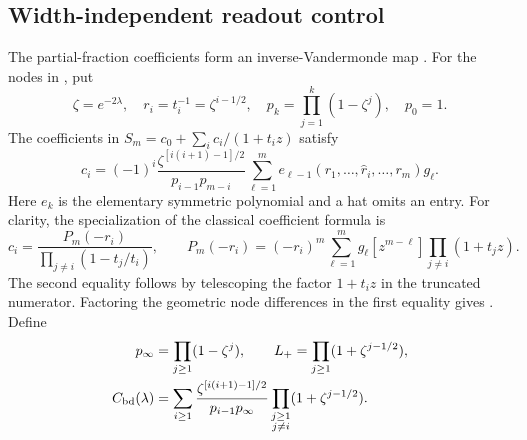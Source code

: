 \subsection{Width-independent readout control}
\label{sec:coefficients}
The partial-fraction coefficients form an inverse-Vandermonde map
\cite{Gautschi1962}. For the nodes in , put
\begin{equation}
 \zeta=e^{-2\lambda},\quad r_i=t_i^{-1}=\zeta^{i-1/2},\quad
 p_k=\prod_{j=1}^k(1-\zeta^j),\quad p_0=1.
 \label{eq:zeta-p}
\end{equation}
The coefficients in $S_m=c_0+\sum_i c_i/(1+t_i z)$ satisfy
\begin{equation}
 c_i=(-1)^i\frac{\zeta^{[i(i+1)-1]/2}}{p_{i-1}p_{m-i}}
 \sum_{\ell=1}^m e_{\ell-1}(r_1,\ldots,\widehat r_i,\ldots,r_m)g_\ell.
 \label{eq:scaled-pf}
\end{equation}
Here $e_k$ is the elementary symmetric polynomial and a hat omits an entry.
For clarity, the specialization of the classical coefficient formula is
\[
 c_i=\frac{P_m(-r_i)}{\prod_{j\ne i}(1-t_j/t_i)},\qquad
 P_m(-r_i)=(-r_i)^m\sum_{\ell=1}^m g_\ell
 [z^{m-\ell}]\prod_{j\ne i}(1+t_jz).
\]
The second equality follows by telescoping the factor $1+t_i z$ in the
truncated numerator. Factoring the geometric node differences in the
first equality gives .
Define
\begin{align}
 p_\infty&=\prod_{j\ge1}(1-\zeta^j),\qquad
 L_+=\prod_{j\ge1}(1+\zeta^{j-1/2}), \label{eq:pinfty}\\
 C_{\mathrm{bd}}(\lambda)&=\sum_{i\ge1}
 \frac{\zeta^{[i(i+1)-1]/2}}{p_{i-1}p_\infty}
 \prod_{\substack{j\ge1\\j\ne i}}(1+\zeta^{j-1/2}).
 \label{eq:Cbd}
\end{align}

